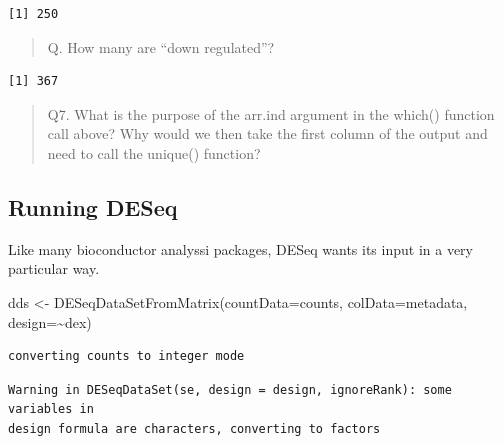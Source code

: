 \documentclass[
  letterpaper,
  DIV=11,
  numbers=noendperiod]{scrartcl}
\newenvironment{Shaded}{\begin{snugshade}}{\end{snugshade}}
\newcommand{\AttributeTok}[1]{\textcolor[rgb]{0.40,0.45,0.13}{#1}}
\newcommand{\DecValTok}[1]{\textcolor[rgb]{0.68,0.00,0.00}{#1}}
\newcommand{\FunctionTok}[1]{\textcolor[rgb]{0.28,0.35,0.67}{#1}}
\newcommand{\NormalTok}[1]{\textcolor[rgb]{0.00,0.23,0.31}{#1}}
\newcommand{\OtherTok}[1]{\textcolor[rgb]{0.00,0.23,0.31}{#1}}
\newcommand{\SpecialCharTok}[1]{\textcolor[rgb]{0.37,0.37,0.37}{#1}}
\begin{document}
\begin{verbatim}
[1] 250
\end{verbatim}

\begin{quote}
Q. How many are ``down regulated''?
\end{quote}

\begin{Shaded}
\end{Shaded}

\begin{verbatim}
[1] 367
\end{verbatim}

\begin{quote}
Q7. What is the purpose of the arr.ind argument in the which() function
call above? Why would we then take the first column of the output and
need to call the unique() function?
\end{quote}

\hypertarget{running-deseq}{%
\subsection{Running DESeq}\label{running-deseq}}

Like many bioconductor analyssi packages, DESeq wants its input in a
very particular way.

\begin{Shaded}
\begin{Highlighting}[]
\NormalTok{dds }\OtherTok{\textless{}{-}} \FunctionTok{DESeqDataSetFromMatrix}\NormalTok{(}\AttributeTok{countData=}\NormalTok{counts,}
                              \AttributeTok{colData=}\NormalTok{metadata,}
                              \AttributeTok{design=}\SpecialCharTok{\textasciitilde{}}\NormalTok{dex)}
\end{Highlighting}
\end{Shaded}

\begin{verbatim}
converting counts to integer mode
\end{verbatim}

\begin{verbatim}
Warning in DESeqDataSet(se, design = design, ignoreRank): some variables in
design formula are characters, converting to factors
\end{verbatim}
\end{document}
